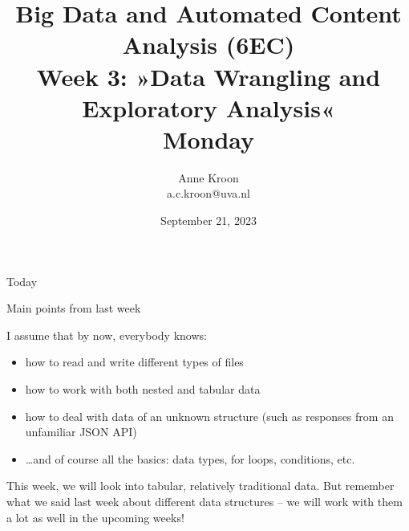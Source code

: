 

\graphicspath{{../../resources/img/}}




\title[Big Data and Automated Content Analysis]{\textbf{Big Data and Automated Content Analysis (6EC)} 
\\Week 3: »Data Wrangling and Exploratory Analysis«
\\Monday}
\author[Anne Kroon]{Anne Kroon\\ \footnotesize{a.c.kroon@uva.nl \\}}
\date{September 21, 2023}


\begin{frame}{}
	\titlepage
\end{frame}

\begin{frame}{Today}
	\tableofcontents
\end{frame}



\begin{frame}{Main points from last week}

\begin{alertblock}{I assume that by now, everybody knows:}
\begin{itemize}
\item how to read and write different types of files
\item how to work with both nested and tabular data
\item how to deal with data of an unknown structure (such as responses from an unfamiliar JSON API)
\item \ldots and of course all the basics: data types, for loops, conditions, etc.
\end{itemize}
\end{alertblock}
\end{frame}

\begin{frame}[standout]
This week, we will look into tabular, relatively traditional data. But remember what we said last week about different data structures -- we will work with them a lot as well in the upcoming weeks!
\end{frame}







